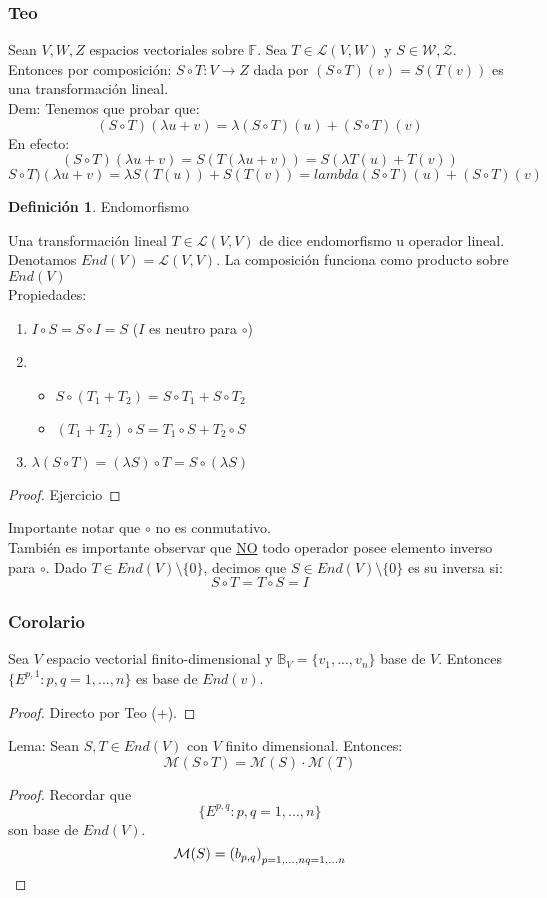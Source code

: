 \documentclass[11pt]{book}
\theoremstyle{definition}
\newtheorem{defn}{Definición}[section]
\begin{document}
\subsubsection{Teo}
Sean $V,W,Z$ espacios vectoriales sobre $\mathbb{F}$. Sea $T\in\mathcal{L}(V,W)$ y $S\in\mathcal{W,Z}$. Entonces por composición: $S\circ T:V\rightarrow Z$ dada por $(S\circ T)(v)=S(T(v))$ es una transformación lineal.\\
Dem: Tenemos que probar que:
\[
	(S\circ T)(\lambda u+v)=\lambda(S\circ T)(u)+(S\circ T)(v)
\]
En efecto:
\[
	(S\circ T)(\lambda u+v)=S(T(\lambda u+v))=S(\lambda T(u)+T(v))
\]
\[
	S\circ T)(\lambda u+v)=\lambda S(T(u))+S(T(v))=lambda(S\circ T)(u)+(S\circ T)(v)
\]
\begin{defn}{Endomorfismo}

	Una transformación lineal $T\in\mathcal{L}(V,V)$ de dice endomorfismo u operador lineal. Denotamos $End (V)=\mathcal{L}(V,V)$. La composición funciona como producto sobre $End(V)$\\
	Propiedades:
	\begin{enumerate}[label=\alph*)]
		\item $I\circ S=S\circ I=S$ ($I$ es neutro para $\circ$)

		\item \begin{itemize} \item $S\circ (T_1+T_2)=S\circ T_1+S\circ T_2$
			      \item $(T_1+T_2)\circ S=T_1\circ S+T_2\circ S$
		      \end{itemize}

		\item $\lambda(S\circ T)=(\lambda S)\circ T=S\circ(\lambda S)$
	\end{enumerate}
\end{defn}
\begin{proof}
	Ejercicio
\end{proof}
Importante notar que $\circ$ no es conmutativo.\\
También es importante observar que \underline{NO} todo operador posee elemento inverso para $\circ$. Dado $T\in End(V)\setminus\{0\}$, decimos que $S\in End(V)\setminus\{0\}$ es su inversa si:
\[
	S\circ T=T\circ S=I
\]
\subsubsection{Corolario}
Sea $V$ espacio vectorial finito-dimensional y $\mathbb{B}_V=\{v_1,...,v_n\}$ base de $V$. Entonces $\{E^{p,1}:p,q=1,...,n\}$ es base de $End(v)$.
\begin{proof}
	Directo por Teo (+).
\end{proof}
Lema: Sean $S,T\in End(V)$ con $V$ finito dimensional. Entonces:
\[
	\mathcal{M}(S\circ T)=\mathcal{M}(S)\cdot\mathcal{M}(T)
\]
\begin{proof}
	Recordar que
	\[\{E^{p,q}:p,q=1,...,n\}\]
	son base de $End(V)$.
	\[\mathcal{M}(S)=\left(b_{p,q}\right)_{p=1,...,n\\q=1,...n}\]
\end{proof}
\end{document}
